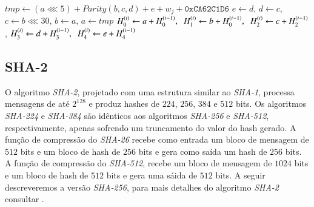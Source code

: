 \documentclass{SBCbookchapter}
\begin{document}
\begin{otherlanguage}{brazilian}
{\begin{algorithm}
\begin{algorithmic}
		\EndFor
			\State $tmp \leftarrow (a \lll 5) + Parity(b,c,d) + e + w_j + \texttt{0xCA62C1D6}$
			\State $e \leftarrow d$, \hspace{2mm} $d \leftarrow c$, \hspace{2mm} $c \leftarrow b \lll 30$, \hspace{2mm} $b \leftarrow a$, \hspace{2mm} $a \leftarrow tmp$
		\EndFor
		\State $H_0^{(i)} \leftarrow a+H_0^{(i-1)}, \hspace{2mm} H_1^{(i)} \leftarrow b+H_0^{(i-1)}, \hspace{2mm} H_2^{(i)} \leftarrow c+H_2^{(i-1)}$,
		\State $H_3^{(i)} \leftarrow d+H_3^{(i-1)}, \hspace{2mm} H_4^{(i)} \leftarrow e+H_4^{(i-1)}$
	\EndFor
	\State {}	
\end{algorithmic}
\label{alg: Algoritmo SHA-1}	
\end{algorithm} 

\subsection{SHA-2}

O algoritmo \textit{SHA-2}, projetado com uma estrutura similar ao \textit{SHA-1}, processa mensagens de até $2^{128}$ e produz
hashes de $224$, $256$, $384$ e $512$ bits. 
Os algoritmos \textit{SHA-224} e \textit{SHA-384} são idênticos aos algoritmos \textit{SHA-256} e \textit{SHA-512}, respectivamente, apenas sofrendo um truncamento do valor do hash gerado. 
A função de compressão do \textit{SHA-26} recebe  como entrada um bloco de mensagem de $512$ bits e um bloco de hash de $256$ bits e gera como saída um hash de $256$ bits. 
A função de compressão do \textit{SHA-512}, recebe um bloco de mensagem de $1024$ bits e um bloco de hash de $512$ bits e gera uma sáida de $512$ bits. 
A seguir descreveremos a versão \textit{SHA-256}, para mais detalhes do algoritmo \textit{SHA-2} consultar \cite{NIST2008}.

}
\end{otherlanguage}
\end{document}
